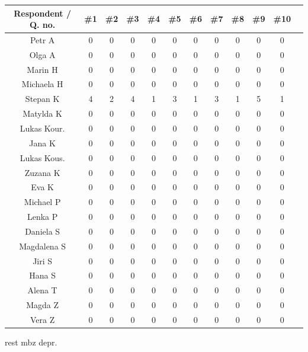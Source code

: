 \begin{tabular}{ |c|c|c|c|c|c|c|c|c|c|c|c| } 
    \hline
    Respondent / Q. no. & \#1 & \#2& \#3& \#4& \#5& \#6& \#7& \#8& \#9& \#10 \\
    \hline
    Petr A      & 0 & 0& 0& 0& 0& 0& 0& 0& 0& 0 \\ 
    Olga A      & 0 & 0& 0& 0& 0& 0& 0& 0& 0& 0 \\ 
    Marin H     & 0 & 0& 0& 0& 0& 0& 0& 0& 0& 0 \\ 
    Michaela H  & 0 & 0& 0& 0& 0& 0& 0& 0& 0& 0 \\ 
    Stepan K    & 4 & 2& 4& 1& 3& 1& 3& 1& 5& 1 \\ 
    Matylda K   & 0 & 0& 0& 0& 0& 0& 0& 0& 0& 0 \\ 
    Lukas Kour. & 0 & 0& 0& 0& 0& 0& 0& 0& 0& 0 \\ 
    Jana K      & 0 & 0& 0& 0& 0& 0& 0& 0& 0& 0 \\ 
    Lukas Kous. & 0 & 0& 0& 0& 0& 0& 0& 0& 0& 0 \\ 
    Zuzana K    & 0 & 0& 0& 0& 0& 0& 0& 0& 0& 0 \\ 
    Eva K       & 0 & 0& 0& 0& 0& 0& 0& 0& 0& 0 \\ 
    Michael P   & 0 & 0& 0& 0& 0& 0& 0& 0& 0& 0 \\ 
    Lenka P     & 0 & 0& 0& 0& 0& 0& 0& 0& 0& 0 \\ 
    Daniela S   & 0 & 0& 0& 0& 0& 0& 0& 0& 0& 0 \\ 
    Magdalena S & 0 & 0& 0& 0& 0& 0& 0& 0& 0& 0 \\ 
    Jiri S      & 0 & 0& 0& 0& 0& 0& 0& 0& 0& 0 \\ 
    Hana S      & 0 & 0& 0& 0& 0& 0& 0& 0& 0& 0 \\ 
    Alena T     & 0 & 0& 0& 0& 0& 0& 0& 0& 0& 0 \\ 
    Magda Z     & 0 & 0& 0& 0& 0& 0& 0& 0& 0& 0 \\ 
    Vera Z      & 0 & 0& 0& 0& 0& 0& 0& 0& 0& 0 \\ 
    \hline
\end{tabular}
\newpage
rest mbz depr.
